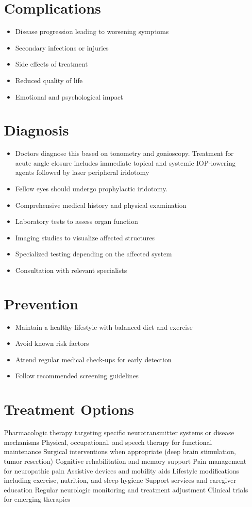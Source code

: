 \section{Complications}
\begin{itemize}[noitemsep]
  \item Disease progression leading to worsening symptoms
  \item Secondary infections or injuries
  \item Side effects of treatment
  \item Reduced quality of life
  \item Emotional and psychological impact
\end{itemize}
\section{Diagnosis}
\begin{itemize}[noitemsep]
  \item Doctors diagnose this based on tonometry and gonioscopy. Treatment for acute angle closure includes immediate topical and systemic IOP-lowering agents followed by laser peripheral iridotomy
  \item Fellow eyes should undergo prophylactic iridotomy.
  \item Comprehensive medical history and physical examination
  \item Laboratory tests to assess organ function
  \item Imaging studies to visualize affected structures
  \item Specialized testing depending on the affected system
  \item Consultation with relevant specialists
\end{itemize}
\section{Prevention}
\begin{itemize}[noitemsep]
  \item Maintain a healthy lifestyle with balanced diet and exercise
  \item Avoid known risk factors
  \item Attend regular medical check-ups for early detection
  \item Follow recommended screening guidelines
\end{itemize}
\section{Treatment Options}
Pharmacologic therapy targeting specific neurotransmitter systems or disease mechanisms Physical, occupational, and speech therapy for functional maintenance Surgical interventions when appropriate (deep brain stimulation, tumor resection) Cognitive rehabilitation and memory support Pain management for neuropathic pain Assistive devices and mobility aids Lifestyle modifications including exercise, nutrition, and sleep hygiene Support services and caregiver education Regular neurologic monitoring and treatment adjustment Clinical trials for emerging therapies

